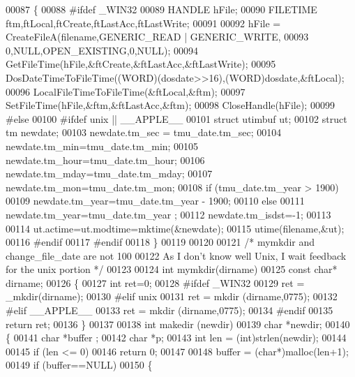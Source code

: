 \begin{DoxyCode}
00087 \{
00088 \textcolor{preprocessor}{#ifdef \_WIN32}
00089   HANDLE hFile;
00090   FILETIME ftm,ftLocal,ftCreate,ftLastAcc,ftLastWrite;
00091 
00092   hFile = CreateFileA(filename,GENERIC\_READ | GENERIC\_WRITE,
00093                       0,NULL,OPEN\_EXISTING,0,NULL);
00094   GetFileTime(hFile,&ftCreate,&ftLastAcc,&ftLastWrite);
00095   DosDateTimeToFileTime((WORD)(dosdate>>16),(WORD)dosdate,&ftLocal);
00096   LocalFileTimeToFileTime(&ftLocal,&ftm);
00097   SetFileTime(hFile,&ftm,&ftLastAcc,&ftm);
00098   CloseHandle(hFile);
00099 \textcolor{preprocessor}{#else}
00100 \textcolor{preprocessor}{#ifdef unix || \_\_APPLE\_\_}
00101   \textcolor{keyword}{struct }utimbuf ut;
00102   \textcolor{keyword}{struct }tm newdate;
00103   newdate.tm\_sec = tmu\_date.tm\_sec;
00104   newdate.tm\_min=tmu\_date.tm\_min;
00105   newdate.tm\_hour=tmu\_date.tm\_hour;
00106   newdate.tm\_mday=tmu\_date.tm\_mday;
00107   newdate.tm\_mon=tmu\_date.tm\_mon;
00108   \textcolor{keywordflow}{if} (tmu\_date.tm\_year > 1900)
00109       newdate.tm\_year=tmu\_date.tm\_year - 1900;
00110   \textcolor{keywordflow}{else}
00111       newdate.tm\_year=tmu\_date.tm\_year ;
00112   newdate.tm\_isdst=-1;
00113 
00114   ut.actime=ut.modtime=mktime(&newdate);
00115   utime(filename,&ut);
00116 \textcolor{preprocessor}{#endif}
00117 \textcolor{preprocessor}{#endif}
00118 \}
00119 
00120 
00121 \textcolor{comment}{/* mymkdir and change\_file\_date are not 100 %
00122 \textcolor{comment}{   As I don't know well Unix, I wait feedback for the unix portion */}
00123 
00124 \textcolor{keywordtype}{int} mymkdir(dirname)
00125     \textcolor{keyword}{const} \textcolor{keywordtype}{char}* dirname;
00126 \{
00127     \textcolor{keywordtype}{int} ret=0;
00128 \textcolor{preprocessor}{#ifdef \_WIN32}
00129     ret = \_mkdir(dirname);
00130 \textcolor{preprocessor}{#elif unix}
00131     ret = mkdir (dirname,0775);
00132 \textcolor{preprocessor}{#elif \_\_APPLE\_\_}
00133     ret = mkdir (dirname,0775);
00134 \textcolor{preprocessor}{#endif}
00135     \textcolor{keywordflow}{return} ret;
00136 \}
00137 
00138 \textcolor{keywordtype}{int} makedir (newdir)
00139     \textcolor{keywordtype}{char} *newdir;
00140 \{
00141   \textcolor{keywordtype}{char} *buffer ;
00142   \textcolor{keywordtype}{char} *p;
00143   \textcolor{keywordtype}{int}  len = (int)strlen(newdir);
00144 
00145   \textcolor{keywordflow}{if} (len <= 0)
00146     \textcolor{keywordflow}{return} 0;
00147 
00148   buffer = (\textcolor{keywordtype}{char}*)malloc(len+1);
00149         \textcolor{keywordflow}{if} (buffer==NULL)
00150         \{
}
\end{DoxyCode}
